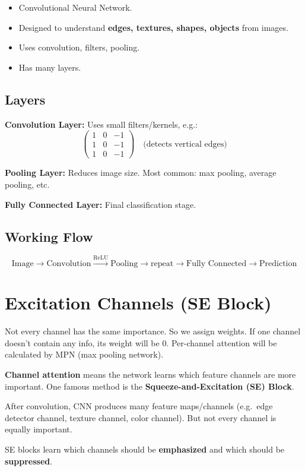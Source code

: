 \documentclass[12pt,a4paper]{article}
\begin{document}
\begin{definitionbox}[CNN]
\begin{itemize}
  \item Convolutional Neural Network.
  \item Designed to understand \textbf{edges, textures, shapes, objects} from images.
  \item Uses convolution, filters, pooling.
  \item Has many layers.
\end{itemize}
\end{definitionbox}

\subsection{Layers}

\textbf{Convolution Layer:} Uses small filters/kernels, e.g.:
\[
\begin{pmatrix} 1 & 0 & -1 \\ 1 & 0 & -1 \\ 1 & 0 & -1 \end{pmatrix} \quad \text{(detects vertical edges)}
\]

\textbf{Pooling Layer:} Reduces image size. Most common: max pooling, average pooling, etc.

\textbf{Fully Connected Layer:} Final classification stage.

\subsection{Working Flow}

\[
\text{Image} \to \text{Convolution} \xrightarrow{\text{ReLU}} \text{Pooling} \to \text{repeat} \to \text{Fully Connected} \to \text{Prediction}
\]

\section{Excitation Channels (SE Block)}

Not every channel has the same importance. So we assign weights. If one channel doesn't contain any info, its weight will be 0. Per-channel attention will be calculated by MPN (max pooling network).

\begin{definitionbox}
\textbf{Channel attention} means the network learns which feature channels are more important. One famous method is the \textbf{Squeeze-and-Excitation (SE) Block}.

After convolution, CNN produces many feature maps/channels (e.g.\ edge detector channel, texture channel, color channel). But not every channel is equally important.

SE blocks learn which channels should be \textbf{emphasized} and which should be \textbf{suppressed}.
\end{definitionbox}
\end{document}
